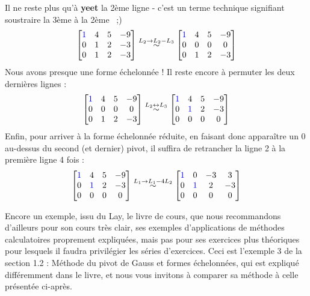Il ne reste plus qu'à \textbf{yeet} la 2ème ligne - c'est un terme technique signifiant soustraire la 3ème à la 2ème \, ;)
$$
\begin{bmatrix}
\color{blue}1  &  4 &  5 & -9\\
0 & 1 & 2 & -3 \\
0 & 1 & 2 & -3 
\end{bmatrix}
\overset{L_2 \to L_2 - L_3}{\sim}
\begin{bmatrix}
\color{blue}1  &  4 &  5 & -9\\
0 & 0 & 0 & 0 \\
0 & 1 & 2 & -3 
\end{bmatrix}
$$
Nous avons presque une forme échelonnée ! Il reste encore à permuter les deux dernières lignes :
$$
\begin{bmatrix}
\color{blue}1  &  4 &  5 & -9\\
0 & 0 & 0 & 0 \\
0 & 1 & 2 & -3 
\end{bmatrix}
\overset{L_2 \leftrightarrow L_3}{\sim}
\begin{bmatrix}
\color{blue}1  &  4 &  5 & -9\\
0 & \color{blue}1 & 2 & -3 \\
0 & 0 & 0 & 0
\end{bmatrix}
$$
Enfin, pour arriver à la forme échelonnée réduite, en faisant donc apparaître un 0 au-dessus du second (et dernier) pivot, il suffira de retrancher la ligne 2 à la première ligne 4 fois :
$$
\begin{bmatrix}
\color{blue}1  &  4 &  5 & -9\\
0 & \color{blue}1 & 2 & -3 \\
0 & 0 & 0 & 0
\end{bmatrix}
\overset{L_1 \to L_1 - 4L_2}{\sim}
\begin{bmatrix}
\color{blue}1  &  0 &  -3 & 3\\
0 & \color{blue}1 & 2 & -3 \\
0 & 0 & 0 & 0
\end{bmatrix}
$$

\noindent Encore un exemple, issu du Lay, le livre de cours, que nous recommandons d'ailleurs pour son cours très clair, ses exemples d'applications de méthodes calculatoires proprement expliquées, mais pas pour ses exercices plus théoriques pour lesquels il faudra privilégier les séries d'exercices. Ceci est l'exemple 3 de la section 1.2 : Méthode du pivot de Gauss et formes échelonnées, qui est expliqué différemment dans le livre, et nous vous invitons à comparer sa méthode à celle présentée ci-après. \\


